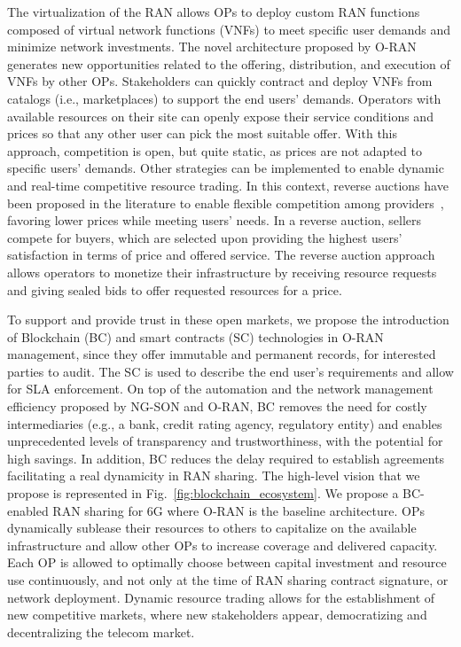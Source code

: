 \documentclass[journal]{IEEEtran}
\begin{document}
The virtualization of the RAN allows OPs to deploy custom RAN functions composed of virtual network functions (VNFs) to meet specific user demands and minimize network investments. The novel architecture proposed by O-RAN generates new opportunities related to the offering, distribution, and execution of VNFs by other OPs. Stakeholders can quickly contract and deploy VNFs from catalogs (i.e., marketplaces) to support the end users' demands. Operators with available resources on their site can openly expose their service conditions and prices so that any other user can pick the most suitable offer. With this approach, competition is open, but quite static, as prices are not adapted to specific users' demands. Other strategies can be implemented to enable dynamic and real-time competitive resource trading. 
In this context, reverse auctions have been proposed in the literature to enable flexible competition among providers~\cite{franco2019brain}, favoring lower prices while meeting users' needs. In a reverse auction, sellers compete for buyers, which are selected upon providing the highest users' satisfaction in terms of price and offered service. The reverse auction approach allows operators to monetize their infrastructure by receiving resource requests and giving sealed bids to offer requested resources for a price. 

To support and provide trust in these open markets, we propose the introduction of Blockchain (BC) and smart contracts (SC) technologies in O-RAN management, since they offer immutable and permanent records, for interested parties to audit. The SC is used to describe the end user's requirements and allow for SLA enforcement. On top of the automation and the network management efficiency proposed by NG-SON and O-RAN, BC removes the need for costly intermediaries (e.g., a bank, credit rating agency, regulatory entity) and enables unprecedented levels of transparency and trustworthiness, with the potential for high savings. In addition, BC reduces the delay required to establish agreements facilitating a real dynamicity in RAN sharing. The high-level vision that we propose is represented in Fig.~\ref{fig:blockchain_ecosystem}. We propose a BC-enabled RAN sharing for 6G where O-RAN is the baseline architecture. OPs dynamically sublease their resources to others to capitalize on the available infrastructure and allow other OPs to increase coverage and delivered capacity. Each OP is allowed to optimally choose between capital investment and resource use continuously, and not only at the time of RAN sharing contract signature, or network deployment. Dynamic resource trading allows for the establishment of new competitive markets, where new stakeholders appear, democratizing and decentralizing the telecom market.
\end{document}
